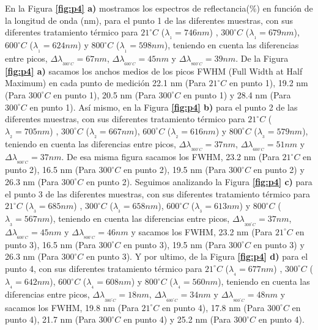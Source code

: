 \documentclass[a4paper,11pt,]{book}
\begin{document}
En la Figura \textbf{\ref{fig:p4} a)}  mostramos los espectros de reflectancia($\%$) en función de la longitud de onda (nm), para el punto 1 de las diferentes muestras, con sus diferentes tratamiento térmico para $21^{\circ} C$ ($\lambda_{_{1}}=746 nm$) ,  $300^{\circ} C$ ($\lambda_{_{1}}=679 nm$), $600^{\circ} C$ ($\lambda_{_{1}}=624 nm$) y  $800^{\circ} C$ ($\lambda_{_{1}}=598 nm$), teniendo en cuenta las diferencias entre picos, $\Delta \lambda_{_{300^{\circ} C}}=67 nm$,  $\Delta \lambda_{_{600^{\circ} C}}=45 nm$ y  $\Delta \lambda_{_{800^{\circ} C}}=39 nm$. De la Figura \textbf{\ref{fig:p4} a)} sacamos  los anchos medios de los picos FWHM (Full Width at Half Maximum)\cite{FMHW1, FMHW2, FMHW3} en cada punto de medición  22.1 nm (Para $21^{\circ} C$ en punto 1),  19.2 nm (Para $300^{\circ} C$ en punto 1),  20.5 nm (Para $300^{\circ} C$ en punto 1) y  28.4 nm (Para $300^{\circ} C$ en punto 1). Así mismo, en la Figura \textbf{\ref{fig:p4} b)}  para el punto 2 de las diferentes muestras, con sus diferentes tratamiento térmico para $21^{\circ} C$ ($\lambda_{_{2}}=705 nm$) ,  $300^{\circ} C$ ($\lambda_{_{2}}=667 nm$), $600^{\circ} C$ ($\lambda_{_{2}}=616 nm$) y  $800^{\circ} C$ ($\lambda_{_{3}}=579 nm$), teniendo en cuenta las diferencias entre picos, $\Delta \lambda_{_{300^{\circ} C}}=37 nm$,  $\Delta \lambda_{_{600^{\circ} C}}=51 nm$ y  $\Delta \lambda_{_{800^{\circ} C}}=37 nm$. De esa misma figura sacamos los FWHM, 23.2 nm (Para $21^{\circ} C$ en punto 2),  16.5 nm (Para $300^{\circ} C$ en punto 2),  19.5 nm (Para $300^{\circ} C$ en punto 2) y  26.3 nm (Para $300^{\circ} C$ en punto 2). Seguimos analizando la Figura \textbf{\ref{fig:p4} c)}  para el punto 3 de las diferentes muestras, con sus diferentes tratamiento térmico para $21^{\circ} C$ ($\lambda_{_{3}}=685 nm$) ,  $300^{\circ} C$ ($\lambda_{_{3}}=658 nm$), $600^{\circ} C$ ($\lambda_{_{3}}=613 nm$) y  $800^{\circ} C$ ($\lambda_{_{3}}=567 nm$), teniendo en cuenta las diferencias entre picos, $\Delta \lambda_{_{300^{\circ} C}}=37 nm$,  $\Delta \lambda_{_{600^{\circ} C}}=45 nm$ y  $\Delta \lambda_{_{800^{\circ} C}}=46 nm$ y  sacamos los FWHM, 23.2 nm (Para $21^{\circ} C$ en punto 3),  16.5 nm (Para $300^{\circ} C$ en punto 3),  19.5 nm (Para $300^{\circ} C$ en punto 3) y  26.3 nm (Para $300^{\circ} C$ en punto 3). Y por ultimo, de la Figura \textbf{\ref{fig:p4} d)} para el punto 4, con sus diferentes tratamiento térmico para $21 ^{\circ} C$ ($\lambda_{_{4}}=677 nm$) ,  $300^{\circ} C$ ($\lambda_{_{4}}=642 nm$), $600^{\circ} C$ ($\lambda_{_{4}}=608 nm$) y  $800^{\circ} C$ ($\lambda_{_{4}}=560 nm$), teniendo en cuenta las diferencias entre picos, $\Delta \lambda_{_{300^{\circ} C}}=18 nm$,  $\Delta \lambda_{_{600^{\circ} C}}=34 nm$ y  $\Delta \lambda_{_{800^{\circ} C}}=48 nm$ y  sacamos los FWHM, 19.8 nm (Para $21^{\circ} C$ en punto 4),  17.8 nm (Para $300^{\circ} C$ en punto 4),  21.7 nm (Para $300^{\circ} C$ en punto 4) y  25.2 nm (Para $300^{\circ} C$ en punto 4).
\end{document}
